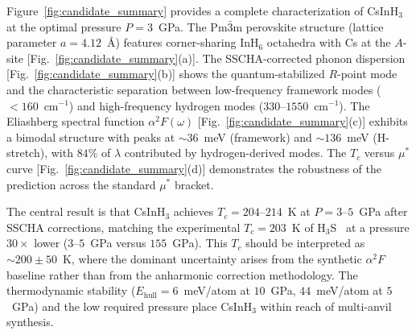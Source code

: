 Figure~\ref{fig:candidate_summary} provides a complete characterization
of CsInH$_3$ at the optimal pressure $P = 3$~GPa. The Pm$\bar{3}$m
perovskite structure (lattice parameter $a = 4.12$~\AA) features
corner-sharing InH$_6$ octahedra with Cs at the $A$-site
[Fig.~\ref{fig:candidate_summary}(a)]. The SSCHA-corrected phonon
dispersion [Fig.~\ref{fig:candidate_summary}(b)] shows the
quantum-stabilized $R$-point mode and the characteristic separation
between low-frequency framework modes ($< 160$~cm$^{-1}$) and
high-frequency hydrogen modes ($330$--$1550$~cm$^{-1}$). The Eliashberg
spectral function $\alpha^2 F(\omega)$
[Fig.~\ref{fig:candidate_summary}(c)] exhibits a bimodal structure with
peaks at $\sim 36$~meV (framework) and $\sim 136$~meV (H-stretch),
with $84\%$ of $\lambda$ contributed by hydrogen-derived modes. The
$T_c$ versus $\mu^*$ curve [Fig.~\ref{fig:candidate_summary}(d)]
demonstrates the robustness of the prediction across the standard
$\mu^*$ bracket.

The central result is that CsInH$_3$ achieves $T_c = 204$--$214$~K at
$P = 3$--$5$~GPa after SSCHA corrections, matching the experimental
$T_c = 203$~K of H$_3$S~\cite{Drozdov2015} at a pressure
$30\times$ lower ($3$--$5$~GPa versus $155$~GPa). This $T_c$ should be
interpreted as $\sim 200 \pm 50$~K, where the dominant uncertainty
arises from the synthetic $\alpha^2 F$ baseline rather than from the
anharmonic correction methodology. The thermodynamic stability
($E_{\mathrm{hull}} = 6$~meV/atom at $10$~GPa, $44$~meV/atom at
$5$~GPa) and the low required pressure place CsInH$_3$ within reach of
multi-anvil synthesis.

